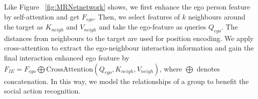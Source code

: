 Like Figure ~\ref{fig:MRNetnetwork} shows, we first enhance the ego person feature by self-attention and get $F_{ego}$. Then, we select features of $k$ neighbours around the target as $K_{neigh}$ and $V_{neigh}$ and take the ego-feature as queries $Q_{ego}$. The distances from neighbours to the target are used for position encoding. 
We apply cross-attention to extract the ego-neighbour interaction information and gain the final interaction enhanced ego feature by $F_{IE} = F_{ego} \bigoplus \text{CrossAttention}(Q_{ego},K_{neigh},V_{neigh})$, where $\bigoplus$ denotes concatenation. In this way, we model the relationships of a group to benefit the social action recognition.




